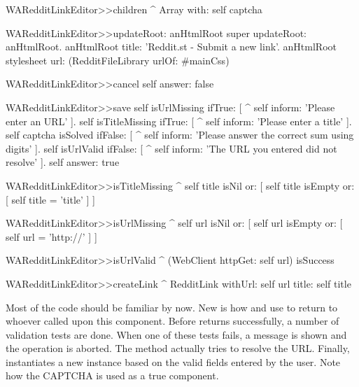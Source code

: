 \documentclass[a4paper,10pt,twoside]{book}
\begin{document}
\begin{code}{}
WARedditLinkEditor>>children
	^ Array with: self captcha
\end{code}

\begin{code}{}
WARedditLinkEditor>>updateRoot: anHtmlRoot
	super updateRoot: anHtmlRoot. 
	anHtmlRoot title: 'Reddit.st - Submit a new link'. 
	anHtmlRoot stylesheet url: (RedditFileLibrary urlOf: #mainCss)
\end{code}


\begin{code}{}
WARedditLinkEditor>>cancel
	self answer: false
\end{code}

\begin{code}{}
WARedditLinkEditor>>save
	self isUrlMissing ifTrue: [ ^ self inform: 'Please enter an URL' ]. 
	self isTitleMissing ifTrue: [ ^ self inform: 'Please enter a title' ]. 
	self captcha isSolved ifFalse: [ ^ self inform: 'Please answer the correct sum using digits' ]. 
	self isUrlValid ifFalse: [ ^ self inform: 'The URL you entered did not resolve' ]. 
	self answer: true
\end{code}



\begin{code}{}
WARedditLinkEditor>>isTitleMissing
	^ self title isNil or: [ self title isEmpty or: [ self title = 'title' ] ]
\end{code}

\begin{code}{}
WARedditLinkEditor>>isUrlMissing
	^ self url isNil or: [ self url isEmpty or: [ self url = 'http://' ] ]
\end{code}

\begin{code}{}
WARedditLinkEditor>>isUrlValid
	^ (WebClient httpGet: self url) isSuccess
\end{code}

\begin{code}{}
WARedditLinkEditor>>createLink
	^ RedditLink withUrl: self url title: self title
\end{code}

Most of the code should be familiar by now. New is how  and  use  to return to whoever called upon this component. Before  returns successfully, a number of validation tests are done. When one of these tests fails, a message is shown and the operation is aborted. The  method actually tries to resolve the URL. Finally,  instantiates a new  instance based on the valid fields entered by the user. Note how the CAPTCHA is used as a true component.
\end{document}
